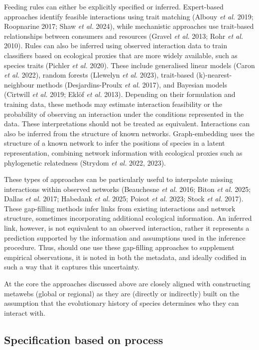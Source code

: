 \documentclass[
]{article}
\begin{document}
Feeding rules can either be explicitly specified or inferred.
Expert-based approaches identify feasible interactions using trait
matching (Albouy \emph{et al.} 2019; Roopnarine 2017; Shaw \emph{et al.}
2024), while mechanistic approaches use trait-based relationships
between consumers and resources (Gravel \emph{et al.} 2013; Rohr
\emph{et al.} 2010). Rules can also be inferred using observed
interaction data to train classifiers based on ecological proxies that
are more widely available, such as species traits (Pichler \emph{et al.}
2020). These include generalised linear models (Caron \emph{et al.}
2022), random forests (Llewelyn \emph{et al.} 2023), trait-based
(k)-nearest-neighbour methods (Desjardins-Proulx \emph{et al.} 2017),
and Bayesian models (Cirtwill \emph{et al.} 2019; Eklöf \emph{et al.}
2013). Depending on their formulation and training data, these methods
may estimate interaction feasibility or the probability of observing an
interaction under the conditions represented in the data. These
interpretations should not be treated as equivalent. Interactions can
also be inferred from the structure of known networks. Graph-embedding
uses the structure of a known network to infer the positions of species
in a latent representation, combining network information with
ecological proxies such as phylogenetic relatedness (Strydom \emph{et
al.} 2022, 2023).

These types of approaches can be particularly useful to interpolate
missing interactions within observed networks (Beauchesne \emph{et al.}
2016; Biton \emph{et al.} 2025; Dallas \emph{et al.} 2017; Habedank
\emph{et al.} 2025; Poisot \emph{et al.} 2023; Stock \emph{et al.}
2017). These gap-filling methods infer links from existing interactions
and network structure, sometimes incorporating additional ecological
information. An inferred link, however, is not equivalent to an observed
interaction, rather it represents a prediction supported by the
information and assumptions used in the inference procedure. Thus,
should one use these gap-filling approaches to supplement empirical
observations, it is noted in both the metadata, and ideally codified in
such a way that it captures this uncertainty.

At the core the approaches discussed above are closely aligned with
constructing metawebs (global or regional) as they are (directly or
indirectly) built on the assumption that the evolutionary history of
species determines who they can interact with.

\subsection{Specification based on process}\label{sec-construct-process}
\end{document}
